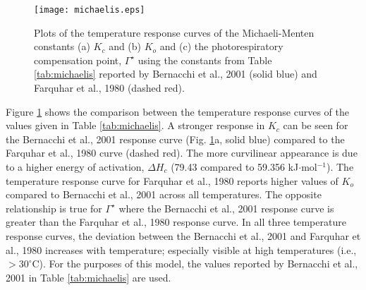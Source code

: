 \begin{figure}[h!]
	\centering
    \texttt{[image: michaelis.eps]}
    \caption{Plots of the temperature response curves of the Michaeli-Menten 
    constants (a) $K_c$ and (b) $K_o$ and (c) the photorespiratory compensation 
    point, $\Gamma^{\star}$ using the constants from Table \ref{tab:michaelis}
    reported by Bernacchi et al., 2001 (solid blue) and Farquhar et al., 1980 
    (dashed red).}
    \label{fig:michaelis}
\end{figure}

\noindent Figure \ref{fig:michaelis} shows the comparison between the temperature response curves of the values given in Table \ref{tab:michaelis}.  
A stronger response in $K_c$ can be seen for the Bernacchi et al., 2001 response curve (Fig. \ref{fig:michaelis}a, solid blue) compared to the Farquhar et al., 1980 curve (dashed red).  
The more curvilinear appearance is due to a higher energy of activation, $\Delta H_c$ (79.43 compared to 59.356 kJ$\cdot$mol$^{-1}$). 
The temperature response curve for Farquhar et al., 1980 reports higher values of $K_o$ compared to Bernacchi et al., 2001 across all temperatures.  
The opposite relationship is true for $\Gamma^{\star}$ where the Bernacchi et al., 2001 response curve is greater than the Farquhar et al., 1980 response curve.  
In all three  temperature response curves, the deviation between the Bernacchi et al., 2001 and Farquhar et al., 1980 increases with temperature; especially visible at high temperatures (i.e., $>30^{\circ}$C). 
For the purposes of this model, the values reported by Bernacchi et al., 2001 in Table \ref{tab:michaelis} are used.  

